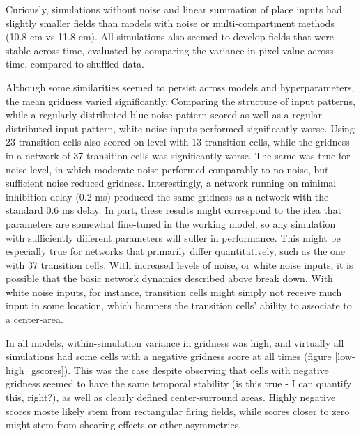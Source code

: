 \documentclass{article}
\begin{document}
    Curiously, simulations without noise and linear summation of place inputs had slightly smaller fields than models with noise or multi-compartment methods (10.8 cm vs 11.8 cm). All simulations also seemed to develop fields that were stable across time, evaluated by comparing the variance in pixel-value across time, compared to shuffled data.

    Although some similarities seemed to persist across models and hyperparameters, the mean gridness varied significantly. Comparing the structure of input patterns, while a regularly distributed blue-noise pattern scored as well as a regular distributed input pattern, white noise inputs performed significantly worse.  Using 23 transition cells also scored on level with 13 transition cells, while the gridness in a network of 37 transition cells was significantly worse. The same was true for noise level, in which moderate noise performed comparably to no noise, but sufficient noise reduced gridness. Interestingly, a network running on minimal inhibition delay (0.2 ms) produced the same gridness as a network with the standard 0.6 ms delay.
    In part, these results might correspond to the idea that parameters are somewhat fine-tuned in the working model, so any simulation with sufficiently different parameters will suffer in performance. This might be especially true for networks that primarily differ quantitatively, such as the one with 37 transition cells. With increased levels of noise, or white noise inputs, it is possible that the basic network dynamics described above break down. With white noise inputs, for instance, transition cells might simply not receive much input in some location, which hampers the transition cells' ability to associate to a center-area. 

    In all models, within-simulation variance in gridness was high, and virtually all simulations had some cells with a negative gridness score at all times (figure \ref{low-high_gscores}). This was the case despite observing that cells with negative gridness seemed to have the same temporal stability (is this true - I can quantify this, right?), as well as clearly defined center-surround areas. Highly negative scores moste likely stem from rectangular firing fields, while scores closer to zero might stem from shearing effects or other asymmetries. 
\end{document}
